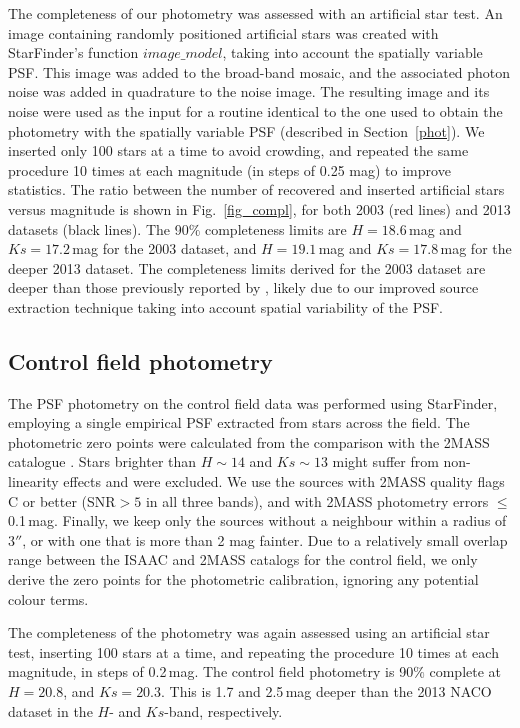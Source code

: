 \documentclass[a4paper,fleqn,usenatbib]{mnras}
\begin{document}
The completeness of our photometry was assessed with an artificial star test. An image containing randomly 
positioned artificial stars was created with {\sc StarFinder}'s function $image\_model$, taking into account the spatially variable PSF.
This image was added to the broad-band mosaic, and the associated photon noise was added in quadrature to the
noise image. 
The resulting image and its noise were used as the input for a routine identical to the one used to obtain the photometry with 
the spatially variable PSF (described in Section~\ref{phot}). 
We inserted only 100 stars at a time to avoid crowding, 
and repeated the same procedure 10 times at each magnitude (in steps of 0.25 mag) to improve statistics. 
The ratio between the number of recovered and inserted artificial stars versus magnitude is shown in Fig.~\ref{fig_compl}, 
for both 2003 (red lines) and 2013 datasets (black lines).
The 90$\%$ completeness limits are $H= 18.6\,$mag and $Ks=17.2\,$mag for the 2003 dataset, and $H=19.1\,$mag and $Ks=17.8\,$mag for the deeper 2013 dataset.
The completeness limits derived for the 2003 dataset are deeper than those previously reported by \citet{derose09}, likely due to our improved source
extraction technique taking into account spatial variability of the PSF.

\subsection{Control field photometry}
\label{cfphot}
The PSF photometry on the control field data was performed using {\sc StarFinder}, employing a single empirical PSF extracted from stars across the field. 
The photometric zero points were calculated from the comparison with the 2MASS catalogue \citep{2mass}. 
Stars brighter than $H\sim 14$ and $Ks\sim 13$ might suffer from non-linearity effects and were excluded. 
We use the sources  with 2MASS quality flags C or better (SNR$>5$ in all three bands), and with 
2MASS photometry errors $\leq$0.1\,mag.
Finally, we keep only the sources without a neighbour within a radius of $3''$, 
or with one that is more than 2 mag fainter. 
Due to a relatively small overlap range between the ISAAC and 2MASS catalogs for the control field, 
we only derive the zero points for the photometric calibration, ignoring any potential colour terms.

The completeness of the photometry was again assessed using an artificial star test, inserting
100 stars at a time, and repeating the procedure 10 times at each magnitude, in steps of 0.2\,mag. 
The control field photometry is 90$\%$ complete at $H=20.8$, and $Ks=20.3$.
This is 1.7 and 2.5\,mag deeper than the 2013 NACO dataset in the $H$- and $Ks$-band, respectively.
\end{document}
